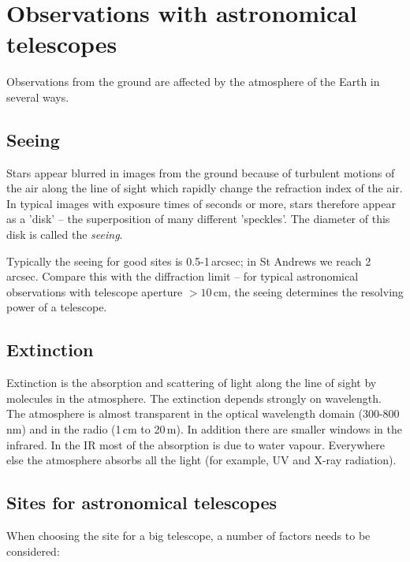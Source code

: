 \section{Observations with astronomical telescopes}

Observations from the ground are affected by the atmosphere of the Earth in several ways.

\subsection{Seeing}

Stars appear blurred in images from the ground because of turbulent motions of the air along the line of sight which rapidly change the refraction index of the air. In typical images with exposure times of seconds or more, stars therefore appear as a 'disk' -- the superposition of many different 'speckles'. The diameter of this disk is called the \textit{seeing}. 

Typically the seeing for good sites is 0.5-1\,arcsec; in St Andrews we reach 2\,arcsec. Compare this with the diffraction limit -- for typical astronomical observations with telescope aperture $>10$\,cm, the seeing determines the resolving power of a telescope.

\subsection{Extinction}

Extinction is the absorption and scattering of light along the line of sight by molecules in the atmosphere. The extinction depends strongly on wavelength. The atmosphere is almost transparent in the optical wavelength domain (300-800\,nm) and in the radio (1\,cm to 20\,m). In addition there are smaller windows in the infrared. In the IR most of the absorption is due to water vapour. Everywhere else the atmosphere absorbs all the light (for example, UV and X-ray radiation).  

\subsection{Sites for astronomical telescopes}

When choosing the site for a big telescope, a number of factors needs to be considered:


